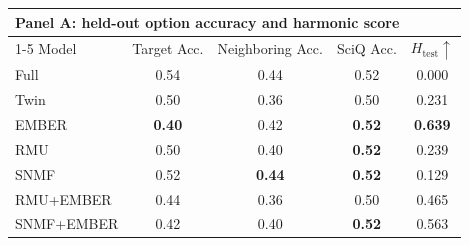 \begin{table}[h]
  \centering
  \scriptsize
  \begin{tabular}{lcccc}
    \toprule
    \multicolumn{5}{l}{\textbf{Panel A: held-out option accuracy and harmonic score}} \\
    \cmidrule(lr){1-5}
    Model & Target Acc. & Neighboring Acc. & SciQ Acc. & $H_{\mathrm{test}}\uparrow$ \\
    \midrule
    Full  & 0.54 & 0.44 & 0.52 & 0.000 \\
    Twin  & 0.50 & 0.36 & 0.50 & 0.231 \\
    EMBER & \textbf{0.40} & 0.42 & \textbf{0.52} & \textbf{0.639} \\
    RMU   & 0.50 & 0.40 & \textbf{0.52} & 0.239 \\
    SNMF  & 0.52 & \textbf{0.44} & \textbf{0.52} & 0.129 \\
    RMU+EMBER & 0.44 & 0.36 & 0.50 & 0.465 \\
    SNMF+EMBER & 0.42 & 0.40 & \textbf{0.52} & 0.563 \\
    \bottomrule
  \end{tabular}


\end{table}
